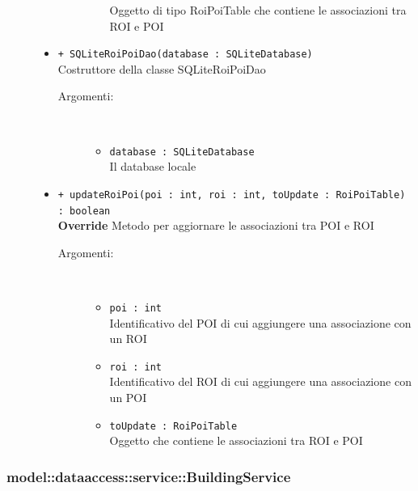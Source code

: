 \documentclass[../DefinizioneDiProdotto.tex]{subfiles}
\begin{document}
\begin{description}
\begin{itemize}
\begin{description}
\begin{itemize}
Oggetto di tipo RoiPoiTable che contiene le associazioni tra ROI e POI\end{itemize}
\end{description}
\item \texttt{+ SQLiteRoiPoiDao(database : SQLiteDatabase)}\\
Costruttore della classe SQLiteRoiPoiDao
 \begin{description}
\item[Argomenti:] \
\begin{itemize}
\item \texttt{database : SQLiteDatabase}\\
Il database locale\end{itemize}
\end{description}
\item \texttt{+ updateRoiPoi(poi : int, roi : int, toUpdate : RoiPoiTable) : boolean}\\
\textbf{Override} Metodo per aggiornare le associazioni tra POI e ROI
 \begin{description}
\item[Argomenti:] \
\begin{itemize}
\item \texttt{poi : int}\\
Identificativo del POI di cui aggiungere una associazione con un ROI\item \texttt{roi : int}\\
Identificativo del ROI di cui aggiungere una associazione con un POI\item \texttt{toUpdate : RoiPoiTable}\\
Oggetto che contiene le associazioni tra ROI e POI\end{itemize}
\end{description}
\end{itemize}
\end{description}

\subsubsection{model::dataaccess::service::BuildingService}
\end{document}
